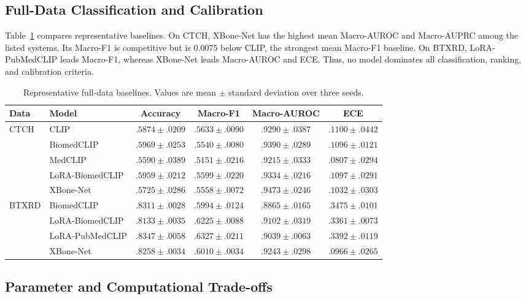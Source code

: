 \documentclass[runningheads]{llncs}
\begin{document}
\subsection{Full-Data Classification and Calibration}

Table~\ref{tab:baseline} compares representative baselines. On CTCH, XBone-Net has the highest mean Macro-AUROC and Macro-AUPRC among the listed systems. Its Macro-F1 is competitive but is 0.0075 below CLIP, the strongest mean Macro-F1 baseline. On BTXRD, LoRA-PubMedCLIP leads Macro-F1, whereas XBone-Net leads Macro-AUROC and ECE. Thus, no model dominates all classification, ranking, and calibration criteria.

\begin{table}[t]
\caption{Representative full-data baselines. Values are mean $\pm$ standard deviation over three seeds.}
\label{tab:baseline}
\centering
\scriptsize
\setlength{\tabcolsep}{3.5pt}
\begin{tabular}{llcccc}
\toprule
Data & Model & Accuracy & Macro-F1 & Macro-AUROC & ECE \\
\midrule
\multirow{5}{*}{CTCH}
& CLIP & $.5874\pm.0209$ & \textbf{$.5633\pm.0090$} & $.9290\pm.0387$ & $.1100\pm.0442$ \\
& BiomedCLIP & $.5969\pm.0253$ & $.5540\pm.0080$ & $.9390\pm.0289$ & $.1096\pm.0121$ \\
& MedCLIP & $.5590\pm.0389$ & $.5151\pm.0216$ & $.9215\pm.0333$ & $.0807\pm.0294$ \\
& LoRA-BiomedCLIP & $.5959\pm.0212$ & $.5599\pm.0220$ & $.9334\pm.0216$ & $.1097\pm.0291$ \\
& XBone-Net & $.5725\pm.0286$ & $.5558\pm.0072$ & \textbf{$.9473\pm.0246$} & $.1032\pm.0303$ \\
\midrule
\multirow{4}{*}{BTXRD}
& BiomedCLIP & $.8311\pm.0028$ & $.5994\pm.0124$ & $.8865\pm.0165$ & $.3475\pm.0101$ \\
& LoRA-BiomedCLIP & $.8133\pm.0035$ & $.6225\pm.0088$ & $.9102\pm.0319$ & $.3361\pm.0073$ \\
& LoRA-PubMedCLIP & \textbf{$.8347\pm.0058$} & \textbf{$.6327\pm.0211$} & $.9039\pm.0063$ & $.3392\pm.0119$ \\
& XBone-Net & $.8258\pm.0034$ & $.6010\pm.0034$ & \textbf{$.9243\pm.0298$} & \textbf{$.0966\pm.0265$} \\
\bottomrule
\end{tabular}
\end{table}

\subsection{Parameter and Computational Trade-offs}
\end{document}
